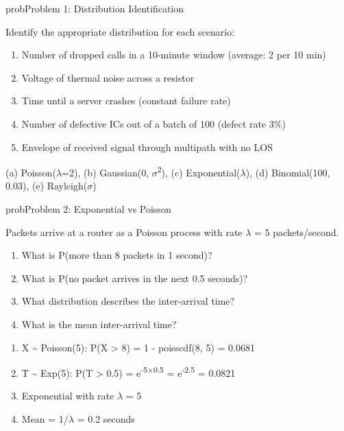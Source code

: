 \begin{PSbox}[unbreakable]{prob}{Problem 1: Distribution Identification}

Identify the appropriate distribution for each scenario:

\begin{enumerate}
\def\labelenumi{(\alph{enumi})}
\tightlist
\item
  Number of dropped calls in a 10-minute window (average: 2 per 10 min)
\item
  Voltage of thermal noise across a resistor
\item
  Time until a server crashes (constant failure rate)
\item
  Number of defective ICs out of a batch of 100 (defect rate 3\%)
\item
  Envelope of received signal through multipath with no LOS
\end{enumerate}

\PSsolution{} (a) Poisson(\ensuremath{\lambda}=2), (b) Gaussian(0, \ensuremath{\sigma}\textsuperscript{2}), (c) Exponential(\ensuremath{\lambda}), (d) Binomial(100, 0.03), (e) Rayleigh(\ensuremath{\sigma})

\end{PSbox}

\begin{PSbox}[unbreakable]{prob}{Problem 2: Exponential vs Poisson}

Packets arrive at a router as a Poisson process with rate \ensuremath{\lambda} = 5 packets/second.

\begin{enumerate}
\def\labelenumi{(\alph{enumi})}
\tightlist
\item
  What is P(more than 8 packets in 1 second)?
\item
  What is P(no packet arrives in the next 0.5 seconds)?
\item
  What distribution describes the inter-arrival time?
\item
  What is the mean inter-arrival time?
\end{enumerate}

\PSsolution{} 

\begin{enumerate}
\def\labelenumi{(\alph{enumi})}
\tightlist
\item
  X \textasciitilde{} Poisson(5): P(X \textgreater{} 8) = 1 - poisscdf(8, 5) = 0.0681
\item
  T \textasciitilde{} Exp(5): P(T \textgreater{} 0.5) = e\textsuperscript{-5\ensuremath{\times}0.5} = e\textsuperscript{-2.5} = 0.0821
\item
  Exponential with rate \ensuremath{\lambda} = 5
\item
  Mean = 1/\ensuremath{\lambda} = 0.2 seconds
\end{enumerate}

\end{PSbox}

